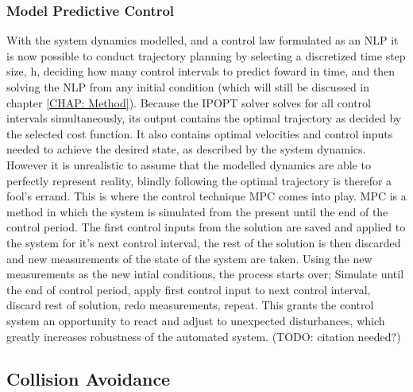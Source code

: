 \subsubsection*{Model Predictive Control}
With the system dynamics modelled, and a control law formulated as an \gls{NLP} it is now possible to conduct trajectory planning by
selecting a discretized time step size, h, deciding how many control intervals to predict foward in time, and then solving the NLP from any initial condition
(which will still be discussed in chapter \ref{CHAP: Method}). Because the \gls{IPOPT} solver
solves for all control intervals simultaneously, its output contains the optimal trajectory as decided by the selected cost function. It also contains optimal
velocities and control inputs needed to achieve the desired state, as described by the system dynamics. However it is unrealistic to assume that the
modelled dynamics are able to perfectly represent reality, blindly following the optimal trajectory is therefor a fool's errand. This is where the
control technique \gls{MPC} comes into play. \gls{MPC} is a method in which the system is simulated from the present until the end of the control
period. The first control inputs from the solution are saved and applied to the system for it's next control interval, the rest of the solution is then
discarded and new measurements of the state of the system are taken. Using the new measurements as the new intial conditions, the process starts over;
Simulate until the end of control period, apply first control input to next control interval, discard rest of solution, redo measurements, repeat.
This grants the control system an opportunity to react and adjust to unexpected disturbances, which greatly increases robustness of the automated system.
(TODO: citation needed?)





\subsection{Collision Avoidance}\label{CHAP: COLAV}


